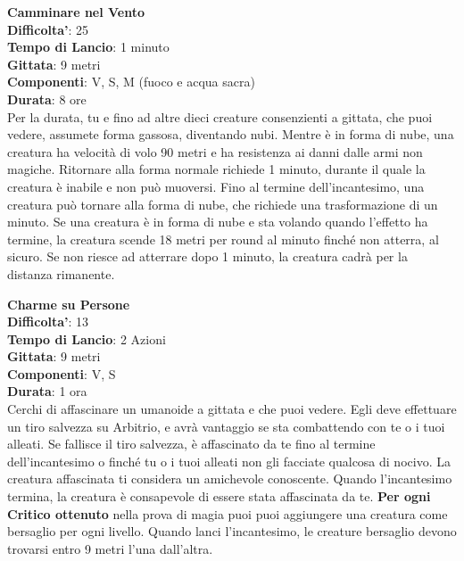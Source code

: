 \begin{multicols}{2}
\medskip\textbf{Camminare nel Vento}\\
\textbf{Difficolta'}: 25\\
\textbf{Tempo di Lancio}: 1 minuto\\
\textbf{Gittata}: 9 metri\\
\textbf{Componenti}: V, S, M (fuoco e acqua sacra)\\
\textbf{Durata}: 8 ore\\
Per la durata, tu e fino ad altre dieci creature consenzienti a gittata, che puoi vedere, assumete forma gassosa, diventando nubi. Mentre è in forma di nube, una creatura ha velocità di volo 90 metri e ha resistenza ai danni dalle armi non magiche. Ritornare alla forma normale richiede 1 minuto, durante il quale la creatura è inabile e non può muoversi. Fino al termine dell’incantesimo, una creatura può tornare alla forma di nube, che richiede una trasformazione di un minuto. Se una creatura è in forma di nube e sta volando quando l’effetto ha termine, la creatura scende 18 metri per round al minuto finché non atterra, al sicuro. Se non riesce ad atterrare dopo 1 minuto, la creatura cadrà per la distanza rimanente.

\medskip\textbf{Charme su Persone}\\
\textbf{Difficolta'}: 13\\
\textbf{Tempo di Lancio}: 2 Azioni\\
\textbf{Gittata}: 9 metri\\
\textbf{Componenti}: V, S\\
\textbf{Durata}: 1 ora\\
Cerchi di affascinare un umanoide a gittata e che puoi vedere. Egli deve effettuare un tiro salvezza su Arbitrio, e avrà vantaggio se sta combattendo con te o i tuoi alleati. Se fallisce il tiro salvezza, è affascinato da te fino al termine dell’incantesimo o finché tu o i tuoi alleati non gli facciate qualcosa di nocivo. La creatura affascinata ti considera un amichevole conoscente. Quando l’incantesimo termina, la creatura è consapevole di essere stata affascinata da te. 
\textbf{Per ogni Critico ottenuto} nella prova di magia puoi puoi aggiungere una creatura come bersaglio per ogni livello. Quando lanci l’incantesimo, le creature bersaglio devono trovarsi entro 9 metri l’una dall’altra.


\end{multicols}
